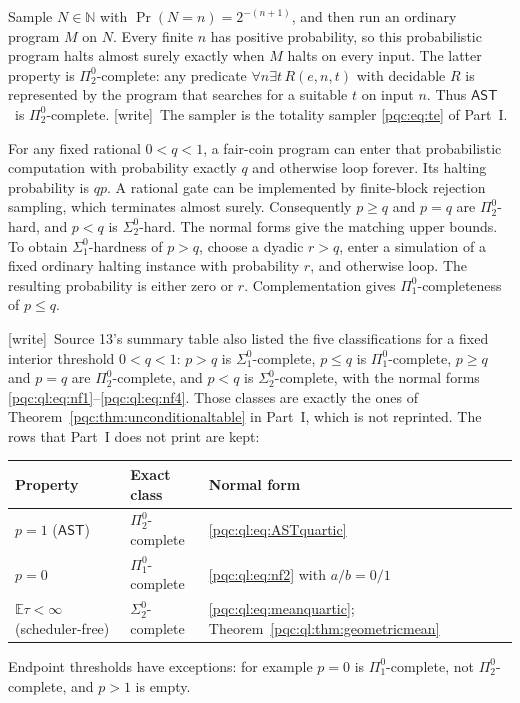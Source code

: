 \documentclass[11pt,letterpaper]{article}
\numberwithin{equation}{section}
\theoremstyle{definition}
\theoremstyle{remark}
\newcommand{\N}{\mathbb N}
\newcommand{\wtag}{\textup{[write]}}
\newcommand{\sigone}{\Sigma^0_1}
\newcommand{\pione}{\Pi^0_1}
\newcommand{\sigtwo}{\Sigma^0_2}
\newcommand{\pitwo}{\Pi^0_2}
\newcommand{\Prob}{\Pr}
\newcommand{\E}{\mathbb E}
\newcommand{\AST}{\ensuremath{\mathsf{AST}}}
\begin{document}
Sample $N\in\N$ with $\Prob(N=n)=2^{-(n+1)}$, and then run an ordinary
program $M$ on $N$. Every finite $n$ has positive probability, so this
probabilistic program halts almost surely exactly when $M$ halts on every
input. The latter property is $\pitwo$-complete: any predicate
$\forall n\exists t\,R(e,n,t)$ with decidable $R$ is represented by the
program that searches for a suitable $t$ on input $n$. Thus \AST\ is
$\pitwo$-complete. \wtag\ The sampler is the totality sampler \eqref{pqc:eq:te} of Part~I.

For any fixed rational $0<q<1$, a fair-coin program can enter that
probabilistic computation with probability exactly $q$ and otherwise loop
forever. Its halting probability is $q p$. A rational gate can be
implemented by finite-block rejection sampling, which terminates almost
surely. Consequently $p\ge q$ and $p=q$ are $\pitwo$-hard, and $p<q$ is
$\sigtwo$-hard. The normal forms give the matching upper bounds. To obtain
$\sigone$-hardness of $p>q$, choose a dyadic $r>q$, enter a simulation of a
fixed ordinary halting instance with probability $r$, and otherwise loop.
The resulting probability is either zero or $r$. Complementation gives
$\pione$-completeness of $p\le q$.

\wtag\ Source 13's summary table also listed the five classifications for a fixed
interior threshold $0<q<1$: $p>q$ is $\sigone$-complete, $p\le q$ is
$\pione$-complete, $p\ge q$ and $p=q$ are $\pitwo$-complete, and $p<q$ is
$\sigtwo$-complete, with the normal forms \eqref{pqc:ql:eq:nf1}--\eqref{pqc:ql:eq:nf4}.
Those classes are exactly the ones of Theorem~\ref{pqc:thm:unconditionaltable}
in Part~I, which is not reprinted. The rows that Part~I does not print are
kept:
\begin{center}
\begin{tabular}{lll}
\toprule
Property & Exact class & Normal form\\
\midrule
$p=1$ (\AST) & $\pitwo$-complete & \eqref{pqc:ql:eq:ASTquartic}\\
$p=0$ & $\pione$-complete & \eqref{pqc:ql:eq:nf2} with $a/b=0/1$\\
$\E\tau<\infty$ (scheduler-free) & $\sigtwo$-complete & \eqref{pqc:ql:eq:meanquartic}; Theorem~\ref{pqc:ql:thm:geometricmean}\\
\bottomrule
\end{tabular}
\end{center}
%
%
%
%
%
%
%
%
%
%
%
%
%
Endpoint thresholds have exceptions: for example $p=0$ is
$\pione$-complete, not $\pitwo$-complete, and $p>1$ is empty.
\end{document}
